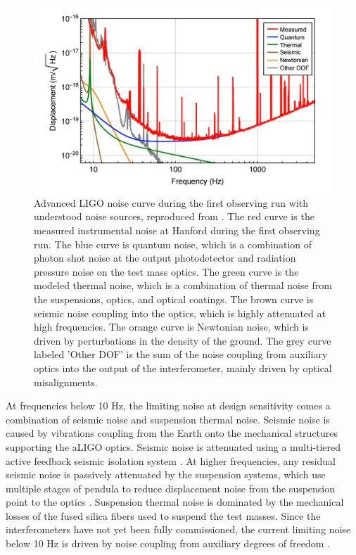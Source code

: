 \begin{figure}[ht!]
\includegraphics[width=\textwidth]{figures/introduction/noise-budget}
\caption[Advanced LIGO noise budget]{Advanced LIGO noise curve during the first %
         observing run with %
         understood noise sources, reproduced from \cite{GW150914-DETECTORS}. %
         The red curve is the measured instrumental noise at Hanford during the first %
         observing run. The blue curve is quantum noise, which is a combination of %
         photon shot noise at the output photodetector and radiation pressure noise %
         on the test mass optics. The green curve is the modeled thermal noise, which is a %
         combination of thermal noise from the suspensions, optics, and optical %
         coatings. The brown curve is seismic noise coupling into the optics, %
         which is highly attenuated at high frequencies. The orange curve is %
         Newtonian noise, which is driven by perturbations in the density of %
         the ground. The grey curve labeled 'Other DOF' is the sum of the %
         noise coupling from auxiliary optics into the output of the interferometer, %
         mainly driven by optical misalignments.
        }
\label{fig:noise-budget}
\end{figure}

At frequencies below 10 Hz, the limiting noise at design sensitivity 
comes a combination of seismic 
noise and suspension thermal noise. Seismic noise is caused by vibrations coupling 
from the Earth onto the mechanical structures supporting the aLIGO optics. 
Seismic noise is attenuated using 
a multi-tiered active feedback seismic isolation system \cite{SeiReview,HEPI}. At higher 
frequencies, any residual seismic noise is passively attenuated by the 
suspension systems, which use multiple stages of pendula to reduce displacement noise 
from the suspension point to the optics \cite{aLIGOSUS}.
Suspension thermal noise is dominated by the mechanical losses of the fused 
silica fibers used to suspend the test masses. 
Since the interferometers have not yet been fully commissioned, the current 
limiting noise below 10 Hz is driven by noise coupling from auxiliary 
degrees of freedom \cite{GW150914-DETECTORS}.

